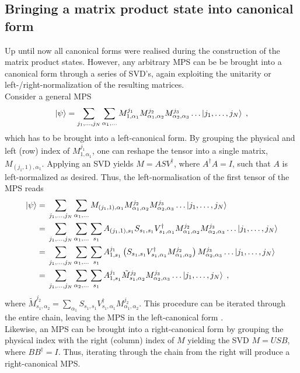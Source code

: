 \subsection{Bringing a matrix product state into canonical form}
Up until now all canonical forms were realised during the construction of the matrix product states. However, any arbitrary MPS can be be brought into a canonical form through a series of SVD's, again exploiting the unitarity or left-/right-normalization of the resulting matrices.\\
Consider a general MPS
\begin{equation}
	\ket{\psi} = \sum_{j_1 , \ldots , j_N} \sum_{\alpha_1 , \ldots } M_{1 , \alpha_1}^{j_1} M_{\alpha_1 , \alpha_2}^{j_2} M_{\alpha_2 , \alpha_3}^{j_3} \ldots \ket{j_1 , \ldots , j_N} \; , 
	\label{eq:generalMPS}
\end{equation}
which has to be brought into a left-canonical form. By grouping the physical and left (row) index of $M_{1 , \alpha_1}^{j_1}$, one can reshape the tensor into a single matrix, $M_{(j_1 , 1) , \alpha_1}$. Applying an SVD yields $M = A S V^{\dag}$, where $A^{\dag} A = I$, such that $A$ is left-normalized as desired. Thus, the left-normalisation of the first tensor of the MPS reads
\begin{align}
\ket{\psi} = & \; \sum_{j_1 , \ldots , j_N} \sum_{\alpha_1 , \ldots } M_{(j_1 , 1) , \alpha_1} M_{\alpha_1 , \alpha_2}^{j_2} M_{\alpha_2 , \alpha_3}^{j_3} \ldots \ket{j_1 , \ldots , j_N} \nonumber \\
= & \; \sum_{j_1 , \ldots , j_N} \sum_{\alpha_1 , \ldots } \sum_{s_1} A_{(j_1 , 1) , s_1} S_{s_1 , s_1} V_{s_1 , \alpha_1}^{\dag} M_{\alpha_1 , \alpha_2}^{j_2} M_{\alpha_2 , \alpha_3}^{j_3} \ldots \ket{j_1 , \ldots , j_N} \nonumber \\
= & \; \sum_{j_1 , \ldots , j_N} \sum_{\alpha_1 , \ldots } \sum_{s_1} A_{1 , s_1}^{j_1} \left( S_{s_1 , s_1} V_{s_1 , \alpha_1}^{\dag} M_{\alpha_1 , \alpha_2}^{j_2} \right) M_{\alpha_2 , \alpha_3}^{j_3} \ldots \ket{j_1 , \ldots , j_N} \nonumber \\
= & \; \sum_{j_1 , \ldots , j_N} \sum_{\alpha_2 , \ldots } \sum_{s_1} A_{1 , s_1}^{j_1} \tilde{M}_{s_1 , \alpha_2}^{j_2} M_{\alpha_2 , \alpha_3}^{j_3} \ldots \ket{j_1 , \ldots , j_N} \; ,
\end{align}
where $\tilde{M}_{s_1 , \alpha_2}^{j_2} = \sum_{\alpha_1} S_{s_1 , s_1} V_{s_1 , \alpha_1}^{\dag} M_{\alpha_1 , \alpha_2}^{j_2}$. This procedure can be iterated through the entire chain, leaving the MPS in the left-canonical form \cite{schollwock}.\\
Likewise, an MPS can be brought into a right-canonical form by grouping the physical index with the right (column) index of $M$ yielding the SVD $M = U S B$, where $B B^{\dag} = I$. Thus, iterating through the chain from the right will produce a right-canonical MPS.

